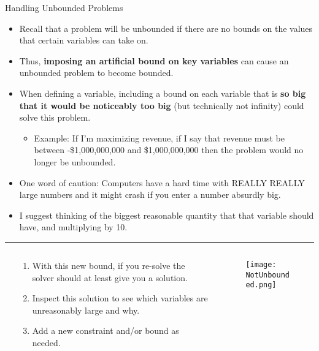 \documentclass[10pt, aspectratio=169]{beamer}
\begin{document}
\begin{frame}{Handling Unbounded Problems}
    \begin{itemize}
        \item Recall that a problem will be unbounded if there are no bounds on the values that certain variables can take on.
        \item Thus, \textbf{imposing an artificial bound on key variables} can cause an unbounded problem to become bounded.
        \item When defining a variable, including a bound on each variable that is \textbf{so big that it would be noticeably too big} (but technically not infinity) could solve this problem.
        \begin{itemize}
            \item Example: If I'm maximizing revenue, if I say that revenue must be between -\$1,000,000,000 and \$1,000,000,000 then the problem would no longer be unbounded.
        \end{itemize}
        \item One word of caution: Computers have a hard time with REALLY REALLY large numbers and it might crash if you enter a number absurdly big.
        \item I suggest thinking of the biggest reasonable quantity that that variable should have, and multiplying by 10.
    \end{itemize}
    \hrule
    \vspace{-0.3cm}
    \begin{columns}
        \begin{column}{0.00\textwidth}
            
        \end{column}
        \begin{column}{0.8\textwidth}
            \begin{enumerate}
                \item With this new bound, if you re-solve the solver should at least give you a solution.
                \item Inspect this solution to see which variables are unreasonably large and why.
                \item Add a new constraint and/or bound as needed.
            \end{enumerate}
        \end{column}
        \begin{column}{0.2\textwidth}
            \begin{figure}
                \texttt{[image: NotUnbounded.png]}
            \end{figure}
        \end{column}
    \end{columns}
\end{frame}
\end{document}
